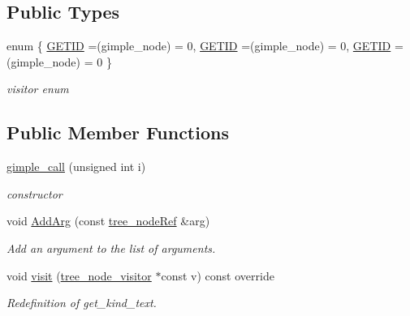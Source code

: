 \subsection*{Public Types}
\begin{DoxyCompactItemize}
\item 
enum \{ \hyperlink{structgimple__call_afe165231f256bdae084f2c0a60bb0bdea0e39cf53db051b033e8c361456eb1908}{G\+E\+T\+ID} =(gimple\+\_\+node) = 0, 
\hyperlink{structgimple__call_afe165231f256bdae084f2c0a60bb0bdea0e39cf53db051b033e8c361456eb1908}{G\+E\+T\+ID} =(gimple\+\_\+node) = 0, 
\hyperlink{structgimple__call_afe165231f256bdae084f2c0a60bb0bdea0e39cf53db051b033e8c361456eb1908}{G\+E\+T\+ID} =(gimple\+\_\+node) = 0
 \}\begin{DoxyCompactList}\small\item\em visitor enum \end{DoxyCompactList}
\end{DoxyCompactItemize}
\subsection*{Public Member Functions}
\begin{DoxyCompactItemize}
\item 
\hyperlink{structgimple__call_a680a2d715eebb0c103ae777a34232666}{gimple\+\_\+call} (unsigned int i)
\begin{DoxyCompactList}\small\item\em constructor \end{DoxyCompactList}\item 
void \hyperlink{structgimple__call_a0a577ce04570418c18529cc09398457c}{Add\+Arg} (const \hyperlink{tree__node_8hpp_a6ee377554d1c4871ad66a337eaa67fd5}{tree\+\_\+node\+Ref} \&arg)
\begin{DoxyCompactList}\small\item\em Add an argument to the list of arguments. \end{DoxyCompactList}\item 
void \hyperlink{structgimple__call_ab493870aac4460fe2d52315b61ee5992}{visit} (\hyperlink{classtree__node__visitor}{tree\+\_\+node\+\_\+visitor} $\ast$const v) const override
\begin{DoxyCompactList}\small\item\em Redefinition of get\+\_\+kind\+\_\+text. \end{DoxyCompactList}\end{DoxyCompactItemize}
